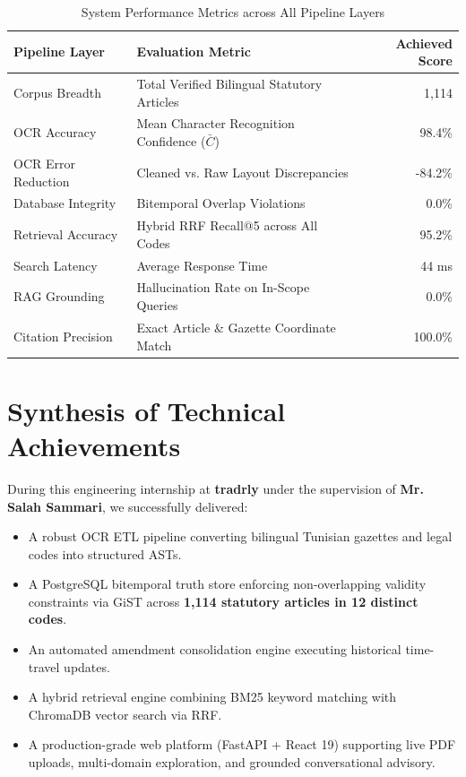 \documentclass[12pt,a4paper]{report}
\begin{document}
\begin{table}[H]
\centering
\small
\caption{System Performance Metrics across All Pipeline Layers}
\label{tab:benchmark_results}
\begin{tabularx}{\textwidth}{l X r}
\toprule
\textbf{Pipeline Layer} & \textbf{Evaluation Metric} & \textbf{Achieved Score} \\
\midrule
Corpus Breadth & Total Verified Bilingual Statutory Articles & 1,114 \\
OCR Accuracy & Mean Character Recognition Confidence ($\bar{C}$) & 98.4\% \\
OCR Error Reduction & Cleaned vs. Raw Layout Discrepancies & -84.2\% \\
Database Integrity & Bitemporal Overlap Violations & 0.0\% \\
Retrieval Accuracy & Hybrid RRF Recall@5 across All Codes & 95.2\% \\
Search Latency & Average Response Time & 44 ms \\
RAG Grounding & Hallucination Rate on In-Scope Queries & 0.0\% \\
Citation Precision & Exact Article \& Gazette Coordinate Match & 100.0\% \\
\bottomrule
\end{tabularx}
\end{table}

\section{Synthesis of Technical Achievements}
During this engineering internship at \textbf{tradrly} under the supervision of \textbf{Mr. Salah Sammari}, we successfully delivered:
\begin{itemize}[leftmargin=20pt, itemsep=3pt]
    \item A robust OCR ETL pipeline converting bilingual Tunisian gazettes and legal codes into structured ASTs.
    \item A PostgreSQL bitemporal truth store enforcing non-overlapping validity constraints via GiST across \textbf{1,114 statutory articles in 12 distinct codes}.
    \item An automated amendment consolidation engine executing historical time-travel updates.
    \item A hybrid retrieval engine combining BM25 keyword matching with ChromaDB vector search via RRF.
    \item A production-grade web platform (FastAPI + React 19) supporting live PDF uploads, multi-domain exploration, and grounded conversational advisory.
\end{itemize}
\end{document}
